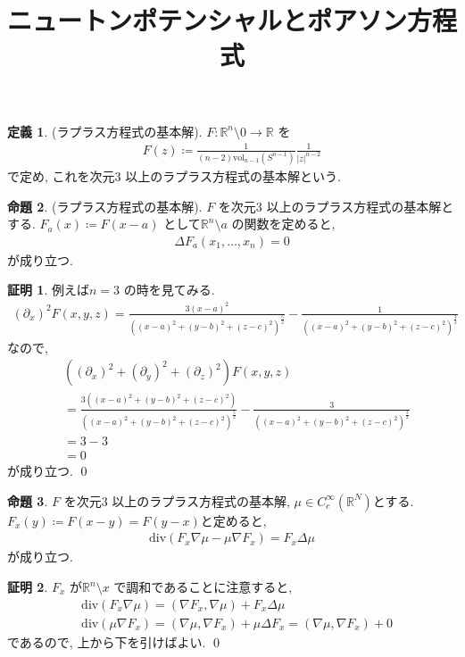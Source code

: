 \documentclass[10pt, fleqn, label-section=none]{bxjsarticle}
\title{ニュートンポテンシャルとポアソン方程式}
\date{}
\author{}
\theoremstyle{definition}
\newtheorem{dfn}{定義}[section]
\newtheorem{prop}[dfn]{命題}
\newtheorem*{pf*}{証明}
\newcommand{\abs}[1]{\left|#1\right|}
\newcommand{\vol}{\textrm{vol}}
\renewcommand{\;}{\, ; \,}
\renewcommand{\div}{\textrm{div}}
\begin{document}
\maketitle

\section{}

\begin{dfn}(ラプラス方程式の基本解). $F: \mathbb R^n \setminus 0 \rightarrow \mathbb R$ を
\begin{align*} F(z) \coloneqq \frac{1}{(n-2)\vol_{n-1} (S^{n-1})} \frac{1}{\abs z ^{n-2}} \end{align*}
で定め, これを次元$3$ 以上のラプラス方程式の基本解という. 
\end{dfn}

\begin{prop}(ラプラス方程式の基本解). $F$ を次元$3$ 以上のラプラス方程式の基本解とする. $F_a (x) \coloneqq F(x -a)$ として$\mathbb R^n \setminus a$ の関数を定めると, 
\begin{align*} \Delta F_a  (x_1, \ldots , x_n) = 0 \end{align*}
が成り立つ. 
\end{prop}
\begin{pf*}
例えば$n = 3$ の時を見てみる. 
\begin{align*} (\partial_x)^2 F(x, y, z) = \frac{3 (x - a)^2}{((x - a)^2 + (y - b)^2 + (z - c)^2)^{\frac{5}{2}}} - \frac{1}{((x - a)^2 + (y - b)^2 + (z - c)^2)^{\frac{3}{2}}}  \end{align*}
なので, 
\begin{align*}  &((\partial_x)^2 +(\partial_y)^2 + (\partial_z)^2)  F(x, y, z)  \\ &= \frac{3( (x - a)^2 + (y - b)^2 + (z - c)^2)  }{((x - a)^2 + (y - b)^2 + (z - c)^2)^{\frac{5}{2}}} -  \frac{3}{((x - a)^2 + (y - b)^2 + (z - c)^2)^{\frac{3}{2}}} \\&= 3 - 3 \\&= 0  \end{align*}
が成り立つ. 
\qed
\end{pf*}


\begin{prop}$F$ を次元$3$ 以上のラプラス方程式の基本解, $\mu \in C_c^\infty (\mathbb R^N)$とする. $F_x (y) \coloneqq F(x-y) = F(y-x)$と定めると, 
\begin{align*} \div(F_x \nabla \mu - \mu \nabla F_x) = F_x \Delta \mu   \end{align*}
が成り立つ. 
\end{prop}
\begin{pf*}$F_x$ が$\mathbb R^n \setminus x$ で調和であることに注意すると, 
\begin{align*} &\div(F_x \nabla \mu) = (\nabla F_x, \nabla \mu) + F_x \Delta \mu \\ &\div(\mu \nabla F_x) = (\nabla \mu, \nabla F_x) + \mu \Delta F_x =  (\nabla \mu, \nabla F_x) + 0\end{align*}
であるので, 上から下を引けばよい. 
\qed
\end{pf*}
\end{document}
